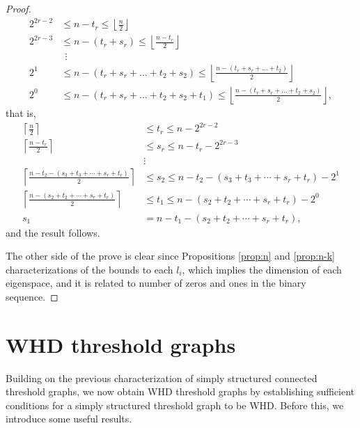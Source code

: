 \documentclass[preprint]{elsarticle}
\begin{document}
\begin{proof}
\begin{align*}
    2^{2r-2} & \leq n-t_r \leq \left\lfloor \frac{n}{2} \right\rfloor \\ 
    2^{2r-3} & \leq  n-(t_r+s_r) \leq \left\lfloor \frac{n-t_r}{2} \right\rfloor \\
    & \ \ \vdots  \\
    2^1 & \leq n-(t_r+s_r+\ldots+t_2+s_2) \leq \left\lfloor \frac{n-(t_r+s_r+\ldots+t_2)}{2} \right\rfloor \\
    2^0 & \leq n-(t_r+s_r+\ldots+t_2+s_2+t_1) \leq \left\lfloor \frac{n-(t_r+s_r+\ldots+t_2+s_2)}{2} \right\rfloor,
\end{align*}
that is, 
\begin{align*}
    \left\lceil \frac{n}{2} \right\rceil & \leq t_r \leq n-2^{2r-2} \\ 
    \left\lceil \frac{n-t_r}{2} \right\rceil & \leq s_r \leq n-t_r-2^{2r-3} \\
    & \vdots \\
    \left\lceil \frac{n-t_2-(s_{3}+t_{3}+\cdots+s_r+t_r)}{2} \right\rceil & \leq s_2 \leq n-t_2-(s_{3}+t_{3}+\cdots+s_r+t_r)-2^1 \\
    \left\lceil \frac{n-(s_2+t_2+\cdots+s_{r}+t_{r})}{2} \right\rceil & \leq t_1 \leq  n-(s_2+t_2+\cdots+s_{r}+t_{r})-2^0\\
     s_1 & = n-t_1-(s_2+t_2+\cdots+s_{r}+t_{r}),
\end{align*}
and the result follows. 

The other side of the prove is clear since Propositions \ref{prop:n} and \ref{prop:n-k}  characterizations of the bounds to each $l_i$, which implies the dimension of each eigenspace, and it is related to number of zeros and ones in the binary sequence. 
\end{proof}




\section{WHD threshold graphs}
\label{sec:4}

Building on the previous characterization of simply structured connected threshold graphs, we now obtain WHD threshold graphs by establishing sufficient conditions for a simply structured threshold graph to be WHD. Before this, we introduce some useful results.
\end{document}
